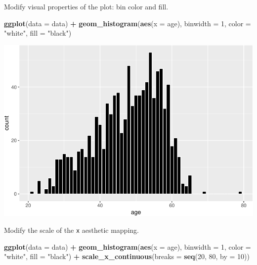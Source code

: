 \documentclass[
]{book}
\newenvironment{Shaded}{\begin{snugshade}}{\end{snugshade}}
\newcommand{\AttributeTok}[1]{\textcolor[rgb]{0.13,0.29,0.53}{#1}}
\newcommand{\DecValTok}[1]{\textcolor[rgb]{0.00,0.00,0.81}{#1}}
\newcommand{\FunctionTok}[1]{\textcolor[rgb]{0.13,0.29,0.53}{\textbf{#1}}}
\newcommand{\NormalTok}[1]{#1}
\newcommand{\SpecialCharTok}[1]{\textcolor[rgb]{0.81,0.36,0.00}{\textbf{#1}}}
\newcommand{\StringTok}[1]{\textcolor[rgb]{0.31,0.60,0.02}{#1}}
\begin{document}
Modify visual properties of the plot: bin color and fill.

\begin{Shaded}
\begin{Highlighting}[]
\FunctionTok{ggplot}\NormalTok{(}\AttributeTok{data =}\NormalTok{ data) }\SpecialCharTok{+}
  \FunctionTok{geom\_histogram}\NormalTok{(}\FunctionTok{aes}\NormalTok{(}\AttributeTok{x =}\NormalTok{ age), }\AttributeTok{binwidth =} \DecValTok{1}\NormalTok{,}
                 \AttributeTok{color =} \StringTok{"white"}\NormalTok{, }\AttributeTok{fill =} \StringTok{"black"}\NormalTok{)}
\end{Highlighting}
\end{Shaded}

\includegraphics{R-for-social-research-and-business-analytics_files/figure-latex/unnamed-chunk-19-1.pdf}

Modify the scale of the \texttt{x} aesthetic mapping.

\begin{Shaded}
\begin{Highlighting}[]
\FunctionTok{ggplot}\NormalTok{(}\AttributeTok{data =}\NormalTok{ data) }\SpecialCharTok{+}
  \FunctionTok{geom\_histogram}\NormalTok{(}\FunctionTok{aes}\NormalTok{(}\AttributeTok{x =}\NormalTok{ age), }\AttributeTok{binwidth =} \DecValTok{1}\NormalTok{,}
                 \AttributeTok{color =} \StringTok{"white"}\NormalTok{, }\AttributeTok{fill =} \StringTok{"black"}\NormalTok{) }\SpecialCharTok{+}
  \FunctionTok{scale\_x\_continuous}\NormalTok{(}\AttributeTok{breaks =} \FunctionTok{seq}\NormalTok{(}\DecValTok{20}\NormalTok{, }\DecValTok{80}\NormalTok{, }\AttributeTok{by =} \DecValTok{10}\NormalTok{))}
\end{Highlighting}
\end{Shaded}
\end{document}
